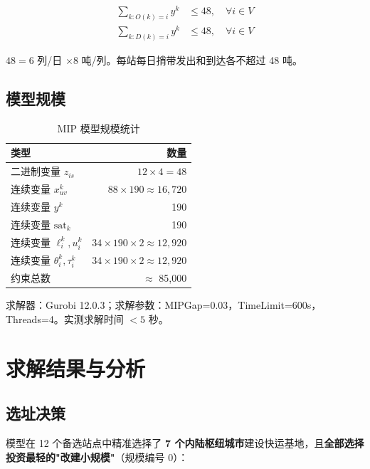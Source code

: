 \documentclass[12pt,a4paper,fontset=none]{ctexart}
\begin{document}
\begin{align}
\sum_{k: O(k)=i} y^k &\le 48, \quad \forall i\in V \label{eq:pig_out} \\
\sum_{k: D(k)=i} y^k &\le 48, \quad \forall i\in V \label{eq:pig_in}
\end{align}

$48 = 6$ 列/日 $\times 8$ 吨/列。每站每日捎带发出和到达各不超过 48 吨。

\subsection{模型规模}

\begin{table}[H]
\centering
\caption{MIP 模型规模统计}
\begin{tabular}{lr}
\toprule
类型 & 数量 \\
\midrule
二进制变量 $z_{is}$ & $12\times 4 = 48$ \\
连续变量 $x_{uv}^k$ & $88\times 190 \approx 16,720$ \\
连续变量 $y^k$ & 190 \\
连续变量 $\text{sat}_k$ & 190 \\
连续变量 $\ell_i^k, u_i^k$ & $34\times 190\times 2 \approx 12,920$ \\
连续变量 $\theta_i^k, \tau_i^k$ & $34\times 190\times 2 \approx 12,920$ \\
\bottomrule
\midrule
约束总数 & $\approx$ 85,000 \\
\bottomrule
\end{tabular}
\end{table}

求解器：Gurobi 12.0.3；求解参数：MIPGap=0.03，TimeLimit=600s，Threads=4。实测求解时间 $< 5$ 秒。

\section{求解结果与分析}

\subsection{选址决策}

模型在 12 个备选站点中精准选择了 \textbf{7 个内陆枢纽城市}建设快运基地，且\textbf{全部选择投资最轻的"改建小规模"}（规模编号 0）：
\end{document}
